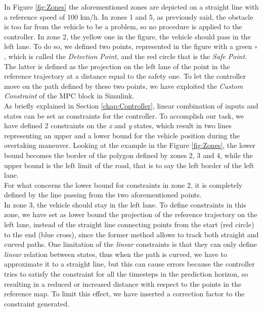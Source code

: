 In Figure \ref{fig:Zones} the aforementioned zones are depicted on a straight line with a reference speed of 100 km/h. In zones 1 and 5, as previously said, the obstacle is too far from the vehicle to be a problem, so no procedure is applied to the controller.
In zone 2, the yellow one in the figure, the vehicle should pass in the left lane. To do so, we defined two points, represented in the figure with a green $\circ$, which is called the \textit{Detection Point}, and the red circle that is the \textit{Safe Point}. The latter is defined as the projection on the left lane of the point in the reference trajectory at a distance equal to the safety one. To let the controller move on the path defined by these two points, we have exploited the \textit{Custom Constraint} of the MPC block in Simulink.\\
As briefly explained in Section \ref{chap:Controller}, linear combination of inputs and states can be set as constraints for the controller. To accomplish our task, we have defined 2 constraints on the \textit{x} and \textit{y} states, which result in two lines representing an upper and a lower bound for the vehicle position during the overtaking maneuver. Looking at the example in the Figure \ref{fig:Zones}, the lower bound becomes the border of the polygon defined by zones 2, 3 and 4, while the upper bound is the left limit of the road, that is to say the left border of the left lane.\\
For what concerns the lower bound for constraints in zone 2, it is completely defined by the line passing from the two aforementioned points.\\
In zone 3, the vehicle should stay in the left lane. To define constraints in this zone, we have set as lower bound the projection of the reference trajectory on the left lane, instead of the straight line connecting points from the start (red circle) to the end (blue cross), since the former method allows to track both straight and curved paths. One limitation of the \textit{linear} constraints is that they can only define \textit{linear} relation between states, thus when the path is curved, we have to approximate it to a straight line, but this can cause errors because the controller tries to satisfy the constraint for all the timesteps in the prediction horizon, so resulting in a reduced or increased distance with respect to the points in the reference map. To limit this effect, we have inserted a correction factor to the constraint generated.
